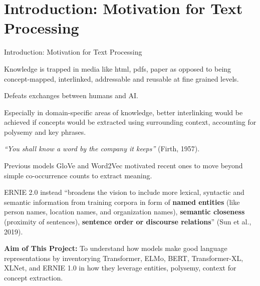
\section{Introduction: Motivation for Text Processing}


\begin{frame}{Introduction: Motivation for Text Processing}



\begin{itemizeSpaced}{5pt}

    \pinkbox Knowledge is trapped in media like html, pdfs, paper as opposed to being concept-mapped, interlinked, addressable and reusable at fine grained levels.
    
    \pinkbox Defeats exchanges between humans and AI.
    
    
    \pinkbox Especially in domain-specific areas of knowledge, better interlinking would be achieved if concepts would be extracted using surrounding context, accounting for polysemy and key phrases.
    
    \item {\color{Maroon} \emph{“You shall know a word by the company it keeps”} (Firth, 1957).}
    
    
    \pinkbox Previous models GloVe and Word2Vec motivated recent ones to move beyond simple co-occurrence counts to extract meaning. 
    
    \item ERNIE 2.0 instead “broadens the vision to include more lexical, syntactic and semantic information from training corpora in form of \textbf{named entities} (like person names, location names, and organization names), \textbf{semantic closeness} (proximity of sentences), \textbf{sentence order or discourse relations}” (Sun et al., 2019). 
    
    
    \pinkbox \textbf{Aim of This Project: } To understand how models make good language representations by inventorying {\color{MediumVioletRed} Transformer, ELMo, BERT, Transformer-XL, XLNet}, and {\color{MediumVioletRed} ERNIE 1.0} in how they leverage entities, polysemy, context for concept extraction. 
    
    
\end{itemizeSpaced}
\end{frame}






